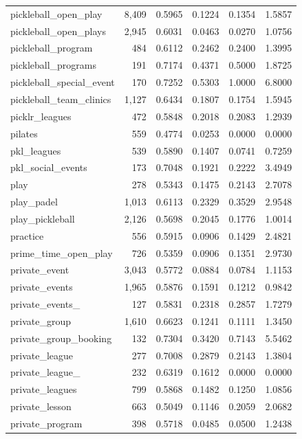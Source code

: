 \begin{table}[htbp]
\begin{tabular}{lrrrrr}
  pickleball\_open\_play & 8,409 & 0.5965 & 0.1224 & 0.1354 & 1.5857 \\
  pickleball\_open\_plays & 2,945 & 0.6031 & 0.0463 & 0.0270 & 1.0756 \\
  pickleball\_program & 484 & 0.6112 & 0.2462 & 0.2400 & 1.3995 \\
  pickleball\_programs & 191 & 0.7174 & 0.4371 & 0.5000 & 1.8725 \\
  pickleball\_special\_event & 170 & 0.7252 & 0.5303 & 1.0000 & 6.8000 \\
  pickleball\_team\_clinics & 1,127 & 0.6434 & 0.1807 & 0.1754 & 1.5945 \\
  picklr\_leagues & 472 & 0.5848 & 0.2018 & 0.2083 & 1.2939 \\
  pilates & 559 & 0.4774 & 0.0253 & 0.0000 & 0.0000 \\
  pkl\_leagues & 539 & 0.5890 & 0.1407 & 0.0741 & 0.7259 \\
  pkl\_social\_events & 173 & 0.7048 & 0.1921 & 0.2222 & 3.4949 \\
  play & 278 & 0.5343 & 0.1475 & 0.2143 & 2.7078 \\
  play\_padel & 1,013 & 0.6113 & 0.2329 & 0.3529 & 2.9548 \\
  play\_pickleball & 2,126 & 0.5698 & 0.2045 & 0.1776 & 1.0014 \\
  practice & 556 & 0.5915 & 0.0906 & 0.1429 & 2.4821 \\
  prime\_time\_open\_play & 726 & 0.5359 & 0.0906 & 0.1351 & 2.9730 \\
  private\_event & 3,043 & 0.5772 & 0.0884 & 0.0784 & 1.1153 \\
  private\_events & 1,965 & 0.5876 & 0.1591 & 0.1212 & 0.9842 \\
  private\_events\_ & 127 & 0.5831 & 0.2318 & 0.2857 & 1.7279 \\
  private\_group & 1,610 & 0.6623 & 0.1241 & 0.1111 & 1.3450 \\
  private\_group\_booking & 132 & 0.7304 & 0.3420 & 0.7143 & 5.5462 \\
  private\_league & 277 & 0.7008 & 0.2879 & 0.2143 & 1.3804 \\
  private\_league\_ & 232 & 0.6319 & 0.1612 & 0.0000 & 0.0000 \\
  private\_leagues & 799 & 0.5868 & 0.1482 & 0.1250 & 1.0856 \\
  private\_lesson & 663 & 0.5049 & 0.1146 & 0.2059 & 2.0682 \\
  private\_program & 398 & 0.5718 & 0.0485 & 0.0500 & 1.2438 \\

\end{tabular}
\end{table}
